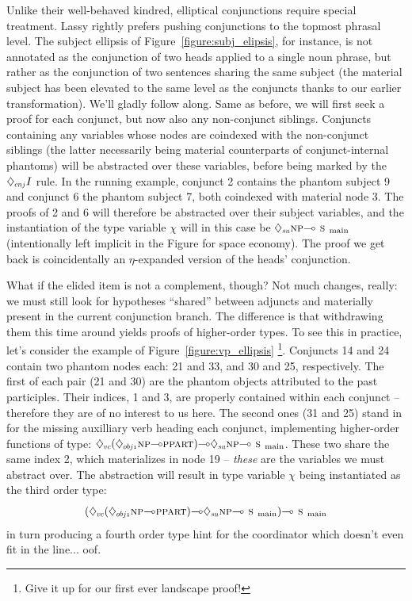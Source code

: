 Unlike their well-behaved kindred, elliptical conjunctions require special treatment.
Lassy rightly prefers pushing conjunctions to the topmost phrasal level.
The subject ellipsis of Figure~\ref{figure:subj_elipsis}, for instance, is not annotated as the conjunction of two heads applied to a single noun phrase, but rather as the conjunction of two sentences sharing the same subject (the material subject has been elevated to the same level as the conjuncts thanks to our earlier transformation).
We'll gladly follow along.
Same as before, we will first seek a proof for each conjunct, but now also any non-conjunct siblings. %
Conjuncts containing any variables whose nodes are coindexed with the non-conjunct siblings (the latter necessarily being material counterparts of conjunct-internal phantoms) will be abstracted over these variables, before being marked by the $\ddia{cnj} I$ rule.
In the running example,  conjunct 2 contains the phantom subject 9 and conjunct 6 the phantom subject 7, both coindexed with material node 3.
The proofs of 2 and 6 will therefore be abstracted over their subject variables, and the instantiation of the type variable $\chi$ will in this case be $\ddia{su}\np[s]\li\smain[s]$ (intentionally left implicit in the Figure for space economy).
The proof we get back is coincidentally an $\eta$-expanded version of the heads' conjunction.

What if the elided item is not a complement, though?
Not much changes, really: we must still look for hypotheses ``shared'' between adjuncts and materially present in the current conjunction branch.
The difference is that withdrawing them this time around yields proofs of higher-order types.
To see this in practice, let's consider the example of Figure~\ref{figure:vp_ellipsis}%
	\footnote{Give it up for our first ever landscape proof!}.
Conjuncts 14 and 24 contain two phantom nodes each: 21 and 33, and 30 and 25, respectively.
The first of each pair (21 and 30) are the phantom objects attributed to the past participles.
Their indices, 1 and 3, are properly contained within each conjunct -- therefore they are of no interest to us here.
The second ones (31 and 25) stand in for the missing auxilliary verb heading each conjunct, implementing higher-order functions of type:
$\ddia{vc}(\ddia{obj1}\np[s]\li\ppart[s])\li\ddia{su}\np[s]\li\smain[s]$.
These two share the same index 2, which materializes in node 19 -- \textit{these} are the variables we must abstract over.
The abstraction will result in type variable $\chi$ being instantiated as the third order type:
\begin{equation*}
(\ddia{vc}(\ddia{obj1}\np[s]\li\ppart[s])\li\ddia{su}\np[s]\li\smain[s])\li\smain
\end{equation*}
in turn producing a fourth order type hint for the coordinator which doesn't even fit in the line... oof.

